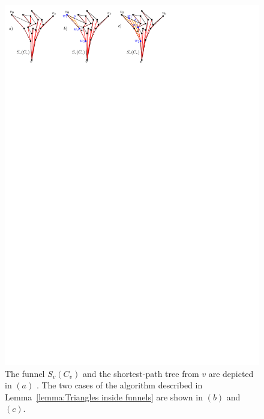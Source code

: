 \documentclass[a4paper,UKenglish]{lipics}
\newcommand{\fn}[2]{\ensuremath{S_{\scriptscriptstyle #1}(#2)}}
\begin{document}
\begin{figure}[tb]
\centering
\includegraphics{img/FunnelCoverShort.pdf}

\caption{\small The funnel $\fn{v}{C_{v}}$ and the shortest-path tree from $v$  are depicted in $(a)$ .
The two cases of the algorithm described in Lemma~\ref{lemma:Triangles inside funnels} are shown in $(b)$ and $(c)$.}
\label{fig:Funnel Cover}
\end{figure}
\end{document}
